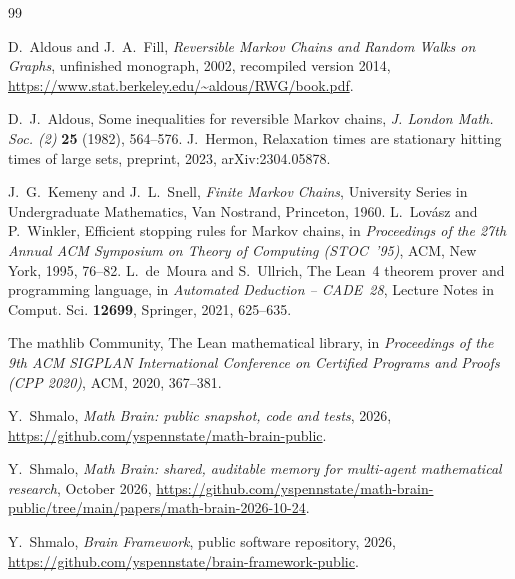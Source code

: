 \documentclass[11pt]{amsart}
\numberwithin{equation}{section}
\begin{document}
\begin{thebibliography}{99}

D.~Aldous and J.~A.~Fill, \emph{Reversible Markov Chains and Random Walks on Graphs}, unfinished monograph, 2002, recompiled version 2014, \url{https://www.stat.berkeley.edu/~aldous/RWG/book.pdf}.

D.~J.~Aldous, Some inequalities for reversible Markov chains, \emph{J. London Math. Soc. (2)} \textbf{25} (1982), 564--576.
J.~Hermon, Relaxation times are stationary hitting times of large sets, preprint, 2023, arXiv:2304.05878.

J.~G.~Kemeny and J.~L.~Snell, \emph{Finite Markov Chains}, University Series in Undergraduate Mathematics, Van Nostrand, Princeton, 1960.
L.~Lov\'asz and P.~Winkler, Efficient stopping rules for Markov chains, in \emph{Proceedings of the 27th Annual ACM Symposium on Theory of Computing (STOC~'95)}, ACM, New York, 1995, 76--82.
L.~de~Moura and S.~Ullrich, The Lean~4 theorem prover and programming language, in \emph{Automated Deduction -- CADE~28}, Lecture Notes in Comput. Sci. \textbf{12699}, Springer, 2021, 625--635.

The mathlib Community, The Lean mathematical library, in \emph{Proceedings of the 9th ACM SIGPLAN International Conference on Certified Programs and Proofs (CPP 2020)}, ACM, 2020, 367--381.

 Y.~Shmalo, \emph{Math Brain: public snapshot, code and tests}, 2026, \url{https://github.com/yspennstate/math-brain-public}.

 Y.~Shmalo, \emph{Math Brain: shared, auditable memory for multi-agent mathematical research}, October 2026, \url{https://github.com/yspennstate/math-brain-public/tree/main/papers/math-brain-2026-10-24}.

 Y.~Shmalo, \emph{Brain Framework}, public software repository, 2026, \url{https://github.com/yspennstate/brain-framework-public}.

\end{thebibliography}
\end{document}

